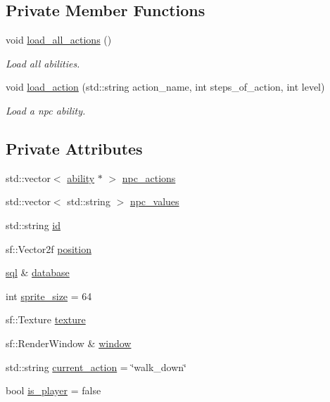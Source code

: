 \subsection*{Private Member Functions}
\begin{DoxyCompactItemize}
\item 
void \hyperlink{classnpc_a357fc1c053fb6fe0e09c03d72f63191a}{load\+\_\+all\+\_\+actions} ()
\begin{DoxyCompactList}\small\item\em Load all abilities. \end{DoxyCompactList}\item 
void \hyperlink{classnpc_a3f32867195150317774af508034f0a41}{load\+\_\+action} (std\+::string action\+\_\+name, int steps\+\_\+of\+\_\+action, int level)
\begin{DoxyCompactList}\small\item\em Load a npc ability. \end{DoxyCompactList}\end{DoxyCompactItemize}
\subsection*{Private Attributes}
\begin{DoxyCompactItemize}
\item 
std\+::vector$<$ \hyperlink{classability}{ability} $\ast$ $>$ \hyperlink{classnpc_afc25127e7611064526758d66e78e4e29}{npc\+\_\+actions}
\item 
std\+::vector$<$ std\+::string $>$ \hyperlink{classnpc_ae50304639c2715b89dc1902c59830acf}{npc\+\_\+values}
\item 
std\+::string \hyperlink{classnpc_af2544175f28e31abaa3587d7807aa60c}{id}
\item 
sf\+::\+Vector2f \hyperlink{classnpc_af27f0e211e77578a73b34c7ea094d82b}{position}
\item 
\hyperlink{classsql}{sql} \& \hyperlink{classnpc_a092e6acb7f951c0805d6c4c948ccd37d}{database}
\item 
int \hyperlink{classnpc_a662c915f75653537fcbffcef96087a48}{sprite\+\_\+size} = 64
\item 
sf\+::\+Texture \hyperlink{classnpc_ade5118e0c4c299eea10fda2d8a6611f6}{texture}
\item 
sf\+::\+Render\+Window \& \hyperlink{classnpc_a7fde3d3012e4dff0d02bf882fa466fc6}{window}
\item 
std\+::string \hyperlink{classnpc_a3ca0e4e222e0e7fee4d3abd9a3c7c5c4}{current\+\_\+action} = \char`\"{}walk\+\_\+down\char`\"{}
\item 
bool \hyperlink{classnpc_a3815e143f7d384cb9bd0a1ab45c729a5}{is\+\_\+player} = false
\end{DoxyCompactItemize}


